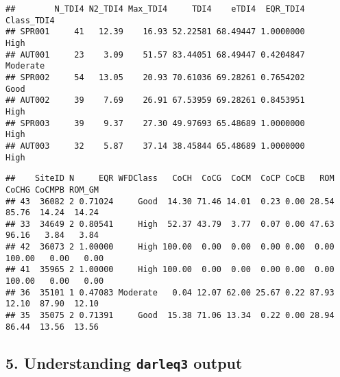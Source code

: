 \documentclass[
]{article}
\newenvironment{Shaded}{\begin{snugshade}}{\end{snugshade}}
\newcommand{\DataTypeTok}[1]{\textcolor[rgb]{0.13,0.29,0.53}{#1}}
\newcommand{\DecValTok}[1]{\textcolor[rgb]{0.00,0.00,0.81}{#1}}
\newcommand{\KeywordTok}[1]{\textcolor[rgb]{0.13,0.29,0.53}{\textbf{#1}}}
\newcommand{\NormalTok}[1]{#1}
\newcommand{\OperatorTok}[1]{\textcolor[rgb]{0.81,0.36,0.00}{\textbf{#1}}}
\newcommand{\StringTok}[1]{\textcolor[rgb]{0.31,0.60,0.02}{#1}}
\begin{document}
\begin{Shaded}
\end{Shaded}

\begin{verbatim}
##        N_TDI4 N2_TDI4 Max_TDI4     TDI4    eTDI4  EQR_TDI4 Class_TDI4
## SPR001     41   12.39    16.93 52.22581 68.49447 1.0000000       High
## AUT001     23    3.09    51.57 83.44051 68.49447 0.4204847   Moderate
## SPR002     54   13.05    20.93 70.61036 69.28261 0.7654202       Good
## AUT002     39    7.69    26.91 67.53959 69.28261 0.8453951       High
## SPR003     39    9.37    27.30 49.97693 65.48689 1.0000000       High
## AUT003     32    5.87    37.14 38.45844 65.48689 1.0000000       High
\end{verbatim}

\begin{Shaded}
\end{Shaded}

\begin{verbatim}
##    SiteID N     EQR WFDClass   CoCH  CoCG  CoCM  CoCP CoCB   ROM  CoCHG CoCMPB ROM_GM
## 43  36082 2 0.71024     Good  14.30 71.46 14.01  0.23 0.00 28.54  85.76  14.24  14.24
## 33  34649 2 0.80541     High  52.37 43.79  3.77  0.07 0.00 47.63  96.16   3.84   3.84
## 42  36073 2 1.00000     High 100.00  0.00  0.00  0.00 0.00  0.00 100.00   0.00   0.00
## 41  35965 2 1.00000     High 100.00  0.00  0.00  0.00 0.00  0.00 100.00   0.00   0.00
## 36  35101 1 0.47083 Moderate   0.04 12.07 62.00 25.67 0.22 87.93  12.10  87.90  12.10
## 35  35075 2 0.71391     Good  15.38 71.06 13.34  0.22 0.00 28.94  86.44  13.56  13.56
\end{verbatim}

\hypertarget{understanding-darleq3-output}{%
\subsection{\texorpdfstring{5. Understanding \texttt{darleq3}
output}{5. Understanding darleq3 output}}\label{understanding-darleq3-output}}
\end{document}
